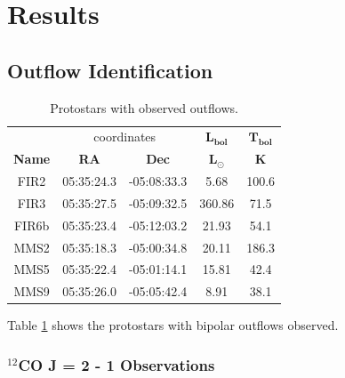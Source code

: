 \section{Results}


\subsection{Outflow Identification}

\begin{table}[h!]
	\caption{Protostars with observed outflows.}
	\label{protostars}
	\begin{center}
		\begin{tabular}{c|c|c|c|c}
			\toprule
			& \multicolumn{2}{c|}{coordinates} & $\mathbf{L_{bol}}$ & $\mathbf{T_{bol}}$\\
			\textbf{Name} & \textbf{RA} & \textbf{Dec} & $\mathbf{L_{\odot}}$ & $\mathbf{K}$\\
			\midrule
			\centering
			FIR2 & 05:35:24.3 & -05:08:33.3 & 5.68 & 100.6\\
			FIR3 & 05:35:27.5 & -05:09:32.5 & 360.86 & 71.5\\
			FIR6b & 05:35:23.4 & -05:12:03.2 & 21.93 & 54.1\\
			MMS2 & 05:35:18.3 & -05:00:34.8 & 20.11 & 186.3\\
			MMS5 & 05:35:22.4 & -05:01:14.1 & 15.81 & 42.4\\
			MMS9 & 05:35:26.0 & -05:05:42.4 & 8.91 & 38.1\\
			\midrule
		\end{tabular}
	\end{center}
\end{table}
Table \ref{protostars} shows the protostars with bipolar outflows observed. 

\subsubsection{$^{12}$CO J = 2 - 1 Observations}

